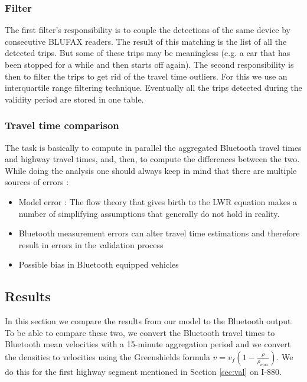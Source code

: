\documentclass[letterpaper,10pt]{article}
\begin{document}
\subsubsection{Filter \label{sec:filter}}

The first filter’s responsibility is to couple the detections of the same device by consecutive BLUFAX readers. The result of this matching is the list of all the detected trips. But some of these trips may be meaningless (e.g. a car that has been stopped for a while and then starts off again). The second responsibility is then to filter the trips to get rid of the travel time outliers. For this we use an interquartile range filtering technique. Eventually all the trips detected during the validity period are stored in one table.
	
\subsubsection{Travel time comparison\label{sec:comparison}}	
	
The task is basically to compute in parallel the aggregated Bluetooth travel times and highway travel times, and, then, to compute the differences between the two. While doing the analysis one should always keep in mind that there are multiple sources of errors :
\begin{itemize}
\item Model error : The flow theory that gives birth to the LWR equation makes a number of simplifying assumptions that generally do not hold in reality. 
\item Bluetooth measurement errors can alter travel time estimations and therefore result in errors in the validation process
\item Possible bias in Bluetooth equipped vehicles
\end{itemize}  

\subsection{Results \label{sec:btResults}}

In this section we compare the results from our model to the Bluetooth output. To be able to compare these two, we convert the Bluetooth travel times to Bluetooth mean velocities with a 15-minute aggregation period and we convert the densities to velocities using the Greenshields formula $v = v_f (1-\frac{\rho}{\rho_{max}})$. We do this for the first highway segment mentioned in Section \ref{sec:val} on I-880.
\end{document}
